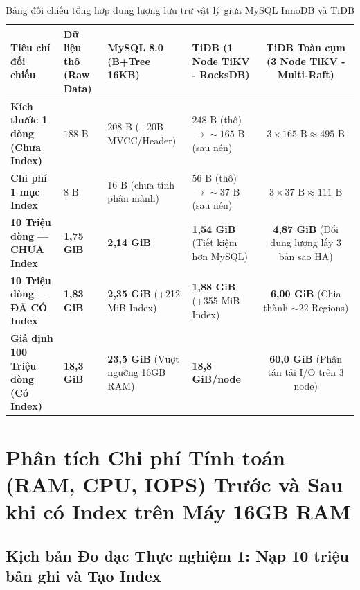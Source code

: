 \begin{table}[H]
\centering
\caption{Bảng đối chiếu tổng hợp dung lượng lưu trữ vật lý giữa MySQL InnoDB và TiDB}
\label{tab:doi_chieu_dung_luong_tong_hop}
\bangfont
\begin{tabularx}{\linewidth}{@{}>{\raggedright\arraybackslash}p{3.5cm}>{\centering\arraybackslash}p{2.3cm}>{\centering\arraybackslash}p{2.6cm}>{\centering\arraybackslash}p{2.7cm}C@{}}
\toprule
\textbf{Tiêu chí đối chiếu} & \textbf{Dữ liệu thô (Raw Data)} & \textbf{MySQL 8.0 (B+Tree 16KB)} & \textbf{TiDB (1 Node TiKV - RocksDB)} & \textbf{TiDB Toàn cụm (3 Node TiKV - Multi-Raft)}\\
\midrule
\textbf{Kích thước 1 dòng (Chưa Index)} & $188\text{ B}$ & $208\text{ B}$ (+20B MVCC/Header) & $248\text{ B}$ (thô) $\rightarrow \sim 165\text{ B}$ (sau nén) & $3 \times 165\text{ B} \approx 495\text{ B}$\\
\midrule
\textbf{Chi phí 1 mục Index } & $8\text{ B}$ & $16\text{ B}$ (chưa tính phân mảnh) & $56\text{ B}$ (thô) $\rightarrow \sim 37\text{ B}$ (sau nén) & $3 \times 37\text{ B} \approx 111\text{ B}$\\
\midrule
\textbf{10 Triệu dòng --- CHƯA Index} & \textbf{1,75 GiB} & \textbf{2,14 GiB} & \textbf{1,54 GiB} (Tiết kiệm hơn MySQL) & \textbf{4,87 GiB} (Đổi dung lượng lấy 3 bản sao HA)\\
\midrule
\textbf{10 Triệu dòng --- ĐÃ CÓ Index } & \textbf{1,83 GiB} & \textbf{2,35 GiB} (+212 MiB Index) & \textbf{1,88 GiB} (+355 MiB Index) & \textbf{6,00 GiB} (Chia thành $\sim 22$ Regions)\\
\midrule
\textbf{Giả định 100 Triệu dòng (Có Index)} & \textbf{18,3 GiB} & \textbf{23,5 GiB} (Vượt ngưỡng 16GB RAM) & \textbf{18,8 GiB/node} & \textbf{60,0 GiB} (Phân tán tải I/O trên 3 node)\\
\bottomrule
\end{tabularx}
\end{table}

\section{Phân tích Chi phí Tính toán (RAM, CPU, IOPS) Trước và Sau khi có Index trên Máy 16GB RAM}
\label{sec:phan_b_chi_phi_tinh_toan}

\subsection{Kịch bản Đo đạc Thực nghiệm 1: Nạp 10 triệu bản ghi và Tạo Index}

